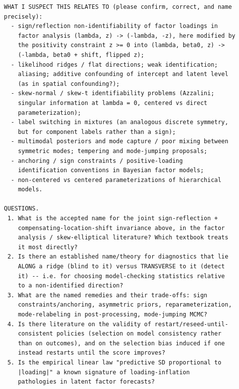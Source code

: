 \documentclass[11pt]{article}
\begin{document}
{\begin{verbatim}
WHAT I SUSPECT THIS RELATES TO (please confirm, correct, and name
precisely):
  - sign/reflection non-identifiability of factor loadings in
    factor analysis (lambda, z) -> (-lambda, -z), here modified by
    the positivity constraint z >= 0 into (lambda, beta0, z) ->
    (-lambda, beta0 + shift, flipped z);
  - likelihood ridges / flat directions; weak identification;
    aliasing; additive confounding of intercept and latent level
    (as in spatial confounding?);
  - skew-normal / skew-t identifiability problems (Azzalini;
    singular information at lambda = 0, centered vs direct
    parameterization);
  - label switching in mixtures (an analogous discrete symmetry,
    but for component labels rather than a sign);
  - multimodal posteriors and mode capture / poor mixing between
    symmetric modes; tempering and mode-jumping proposals;
  - anchoring / sign constraints / positive-loading
    identification conventions in Bayesian factor models;
  - non-centered vs centered parameterizations of hierarchical
    models.

QUESTIONS.
 1. What is the accepted name for the joint sign-reflection +
    compensating-location-shift invariance above, in the factor
    analysis / skew-elliptical literature? Which textbook treats
    it most directly?
 2. Is there an established name/theory for diagnostics that lie
    ALONG a ridge (blind to it) versus TRANSVERSE to it (detect
    it) -- i.e. for choosing model-checking statistics relative
    to a non-identified direction?
 3. What are the named remedies and their trade-offs: sign
    constraints/anchoring, asymmetric priors, reparameterization,
    mode-relabeling in post-processing, mode-jumping MCMC?
 4. Is there literature on the validity of restart/reseed-until-
    consistent policies (selection on model consistency rather
    than on outcomes), and on the selection bias induced if one
    instead restarts until the score improves?
 5. Is the empirical linear law "predictive SD proportional to
    |loading|" a known signature of loading-inflation
    pathologies in latent factor forecasts?
\end{verbatim}
}
\end{document}

